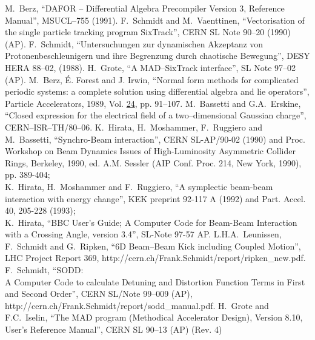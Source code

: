 \documentclass[a4paper,11pt]{report}
\begin{document}
\begin{thebibliography}{99}
%
 M.~Berz, ``DAFOR -- Differential Algebra Precompiler
  Version 3, Reference Manual'', MSUCL--755 (1991).
%
 F.~Schmidt and M.~Vaenttinen, ``Vectorisation of the
  single particle tracking program SixTrack'', CERN SL Note 90--20
  (1990) (AP).  
%
 F.~Schmidt, ``Untersuchungen zur dynamischen
  Akzeptanz von Protonenbeschleunigern und ihre Begrenzung durch
  chaotische Bewegung'', DESY HERA 88--02, (1988).  
%
%
 H.~Grote, ``A MAD--SixTrack interface'', SL Note
  97--02 (AP).  
%
 M.~Berz, \'{E}. Forest
  and J. Irwin, ``Normal form methods for complicated periodic
  systems: a complete solution using differential algebra and lie
  operators'', Particle Accelerators, 1989, Vol. \underline{24}, pp.
  91--107.  
%
 M.~Bassetti and G.A.~Erskine,
  ``Closed expression for the electrical field of a two--dimensional
  Gaussian charge'', CERN--ISR--TH/80--06.  
%
 K.~Hirata, H.~Moshammer, F.~Ruggiero and M.~Bassetti,
  ``Synchro-Beam interaction'', CERN SL-AP/90-02 (1990) and Proc.
  Workshop on Beam Dynamics Issues of High-Luminosity Asymmetric
  Collider Rings, Berkeley, 1990, ed. A.M. Sessler (AIP Conf.  Proc.
  214, New York, 1990), pp. 389-404;\\
  K.~Hirata, H.~Moshammer and F.~Ruggiero, ``A symplectic beam-beam
  interaction with energy change'', KEK preprint 92-117 A (1992) and
  Part. Accel. 40, 205-228 (1993);\\
  K.~Hirata, ``BBC User's Guide; A Computer Code for Beam-Beam Interaction 
  with a Crossing Angle, version 3.4'', SL-Note 97-57 AP.
%
 L.H.A.~Leunissen, F.~Schmidt and G.~Ripken, ``6D
  Beam--Beam Kick including Coupled Motion'', LHC Project Report 369,
  {http://cern.ch/Frank.Schmidt/report/ripken\_new.pdf}.
%
 F.~Schmidt, ``SODD:\\ A Computer Code to calculate
  Detuning and Distortion Function Terms in First and Second Order'',
  CERN SL/Note 99--009 (AP),
  {http://cern.ch/Frank.Schmidt/report/sodd\_manual.pdf}.
%
  H.~Grote and F.C.~Iselin, ``The MAD program (Methodical Accelerator
  Design), Version 8.10, User's Reference Manual'', CERN SL 90--13
  (AP) (Rev. 4)\\

\end{thebibliography}
\end{document}
